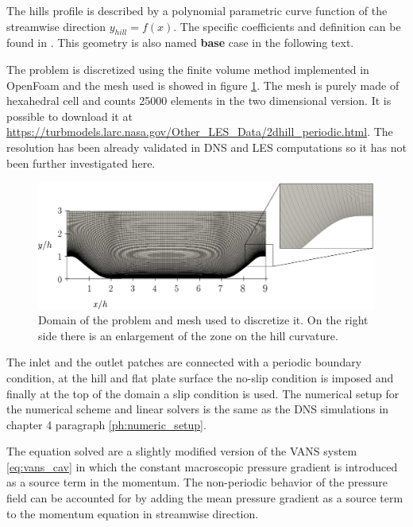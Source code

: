 The hills profile is described by a polynomial parametric curve function of the streamwise direction $y_{hill} = f(x)$. The specific coefficients and definition can be found in \citet{almeida1993wake}. This geometry is also named \textbf{base} case in the following text.

The problem is discretized using the finite volume method implemented in OpenFoam and the mesh used is showed in figure \ref{fig:mesh_hill}. The mesh is purely made of hexahedral cell and counts 25000 elements in the two dimensional version. It is possible to download it at \url{https://turbmodels.larc.nasa.gov/Other_LES_Data/2dhill_periodic.html}. The resolution has been already validated in DNS and LES computations so it has not been further investigated here.

\begin{figure}[h]
	\centering
	\includegraphics[width=1\linewidth]{chapter_5/figure/mesh}
	\caption{Domain of the problem and mesh used to discretize it. On the right side there is an enlargement of the zone on the hill curvature.}
	\label{fig:mesh_hill}
\end{figure}

The inlet and the outlet patches are connected with a periodic boundary condition, at the hill and flat plate surface the no-slip condition is imposed and finally at the top of the domain a slip condition is used.
The numerical setup for the numerical scheme and linear solvers is the same as the DNS simulations in chapter 4 paragraph \ref{ph:numeric_setup}.

The equation solved are a slightly modified version of the VANS system \eqref{eq:vans_cav} in which the constant macroscopic pressure gradient is introduced as a source term in the momentum.
The non-periodic behavior of the pressure field can be accounted for by adding the mean pressure gradient as a source term to the momentum equation in streamwise direction.

